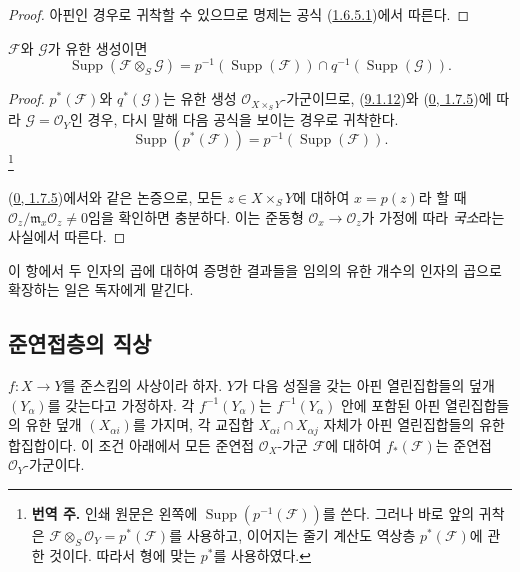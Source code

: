 \begin{proof}
아핀인 경우로 귀착할 수 있으므로 명제는 공식
(\hyperref[I.1.6.5.1-ko]{1.6.5.1})에서 따른다.
\end{proof}

\begin{corollary}[9.1.13]
\label{I.9.1.13-ko}
$\mathscr{F}$와 $\mathscr{G}$가 유한 생성이면
\[
  \operatorname{Supp}(\mathscr{F}\otimes_S\mathscr{G})
  =p^{-1}(\operatorname{Supp}(\mathscr{F}))
  \cap q^{-1}(\operatorname{Supp}(\mathscr{G})).
\]
\end{corollary}

\begin{proof}
$p^*(\mathscr{F})$와 $q^*(\mathscr{G})$는 유한 생성
$\mathscr{O}_{X\times_S Y}$-가군이므로,
(\hyperref[I.9.1.12-ko]{9.1.12})와
(\hyperref[0.1.7.5-ko]{0, 1.7.5})에 따라
$\mathscr{G}=\mathscr{O}_Y$인 경우, 다시 말해 다음 공식을 보이는
경우로 귀착한다.
\[
  \operatorname{Supp}(p^*(\mathscr{F}))
  =p^{-1}(\operatorname{Supp}(\mathscr{F})).
  \tag{9.1.13.1}\label{I.9.1.13.1-ko}
\]\footnote{\textbf{번역 주.} 인쇄 원문은 왼쪽에
$\operatorname{Supp}(p^{-1}(\mathscr{F}))$를 쓴다. 그러나 바로 앞의
귀착은 $\mathscr{F}\otimes_S\mathscr{O}_Y=p^*(\mathscr{F})$를 사용하고,
이어지는 줄기 계산도 역상층 $p^*(\mathscr{F})$에 관한 것이다. 따라서
형에 맞는 $p^*$를 사용하였다.}

(\hyperref[0.1.7.5-ko]{0, 1.7.5})에서와 같은 논증으로, 모든
$z\in X\times_S Y$에 대하여 $x=p(z)$라 할 때
$\mathscr{O}_z/\mathfrak{m}_x\mathscr{O}_z\neq0$임을 확인하면 충분하다.
이는 준동형 $\mathscr{O}_x\to\mathscr{O}_z$가 가정에 따라
\emph{국소}라는 사실에서 따른다.
\end{proof}

이 항에서 두 인자의 곱에 대하여 증명한 결과들을 임의의 유한 개수의
인자의 곱으로 확장하는 일은 독자에게 맡긴다.

\subsection{준연접층의 직상}
\label{subsection:I.9.2-ko}

\begin{proposition}[9.2.1]
\label{I.9.2.1-ko}
$f:X\to Y$를 준스킴의 사상이라 하자. $Y$가 다음 성질을 갖는 아핀
열린집합들의 덮개 $(Y_\alpha)$를 갖는다고 가정하자. 각
$f^{-1}(Y_\alpha)$는 $f^{-1}(Y_\alpha)$ 안에 포함된 아핀 열린집합들의 유한 덮개
$(X_{\alpha i})$를 가지며, 각 교집합
$X_{\alpha i}\cap X_{\alpha j}$ 자체가 아핀 열린집합들의 유한
합집합이다. 이 조건 아래에서 모든 준연접 $\mathscr{O}_X$-가군
$\mathscr{F}$에 대하여 $f_*(\mathscr{F})$는 준연접
$\mathscr{O}_Y$-가군이다.
\end{proposition}


